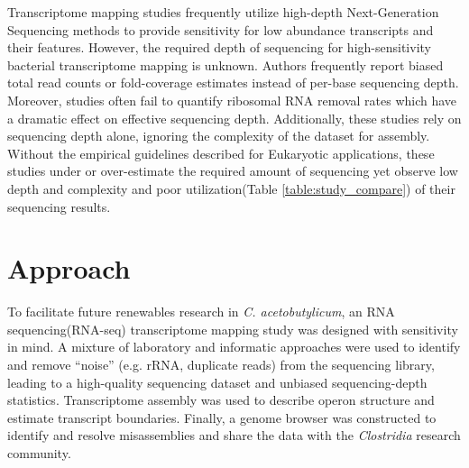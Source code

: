 Transcriptome mapping studies frequently utilize high-depth Next-Generation Sequencing methods to provide sensitivity for low abundance transcripts and their features.\cite{25,58,108,109} However, the required depth of sequencing for high-sensitivity bacterial transcriptome mapping is unknown\cite{110,111,112}. Authors frequently report biased total read counts or fold-coverage estimates instead of per-base sequencing depth.\cite{113,114,115} Moreover, studies often fail to quantify ribosomal RNA removal rates\cite{113,114,115} which have a dramatic effect on effective sequencing depth.\cite{116,117,118} Additionally, these studies rely on sequencing depth alone, ignoring the complexity of the dataset for assembly.\cite{18,108,109} Without the empirical guidelines described for Eukaryotic applications,\cite{110} these studies under\cite{113,119} or over-estimate\cite{114,115} the required amount of sequencing yet observe low depth and complexity\cite{115} and poor utilization(Table \ref{table:study_compare}) of their sequencing results.

\section{Approach}
To facilitate future renewables research in \textit{C. acetobutylicum}, an RNA sequencing(RNA-seq) transcriptome mapping study was designed with sensitivity in mind. A mixture of laboratory and informatic approaches were used to identify and remove ``noise'' (e.g. rRNA, duplicate reads) from the sequencing library, leading to a high-quality sequencing dataset and unbiased sequencing-depth statistics. Transcriptome assembly was used to describe operon structure and estimate transcript boundaries. Finally, a genome browser was constructed to identify and resolve misassemblies and share the data with the \textit{Clostridia} research community.


